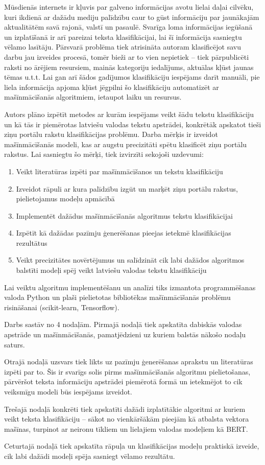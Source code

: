 Mūsdienās internets ir kļuvis par galveno informācijas avotu lielai daļai cilvēku, kuri ikdienā ar dažādu mediju palīdzību caur to gūst informāciju par jaunākajām aktualitātēm savā rajonā, valstī un pasaulē. Svarīga loma informācijas iegūšanā un izplatīšanā ir arī pareizai teksta klasifikācijai, lai šī informācija sasniegtu vēlamo lasītāju. Pārsvarā problēma tiek atrisināta autoram klasificējot savu darbu jau izveides procesā, tomēr bieži ar to vien nepietiek – tiek pārpublicēti raksti no ārējiem resursiem, mainās kategoriju iedalījums, aktuālas kļūst jaunas tēmas u.t.t. Lai gan arī šādos gadījumos klasifikāciju iespējams darīt manuāli, pie liela informācija apjoma kļūst jēgpilni šo klasifikāciju automatizēt ar mašīnmācīšanās algoritmiem, ietaupot laiku un resursus. 

Autors plāno izpētīt metodes ar kurām iespējams veikt šādu tekstu klasifikāciju un kā tās ir piemērotas latviešu valodas tekstu apstrādei, konkrētāk apskatot tieši ziņu portālu rakstu klasifikācijas problēmu. Darba mērķis ir izveidot mašīnmācīšanās modeli, kas ar augstu precizitāti spētu klasificēt ziņu portālu rakstus. Lai sasniegtu šo mērķi, tiek izvirzīti sekojoši uzdevumi:
\begin{enumerate}
\item Veikt literatūras izpēti par mašīnmācīšanos un tekstu klasifikāciju
\item Izveidot rāpuli ar kura palīdzību izgūt un marķēt ziņu portālu rakstus, pielietojamus modeļu apmācībā
\item Implementēt dažādus mašīnmācīšanās algoritmus tekstu klasifikācijai
\item Izpētīt kā dažādas pazīmju ģenerēšanas pieejas ietekmē klasifikācijas rezultātus
\item Veikt precizitātes novērtējumus un salīdzināt cik labi dažādos algoritmos balstīti modeļi spēj veikt latviešu valodas tekstu klasifikāciju
\end{enumerate}

Lai veiktu algoritmu implementēšanu un analīzi tiks izmantota programmēšanas valoda Python un plaši pielietotas bibliotēkas mašīnmācīšanās problēmu risināšanai (scikit-learn, Tensorflow).

Darbs sastāv no 4 nodaļām. Pirmajā nodaļā tiek apskatīta dabiskās valodas apstrāde un mašīnmācīšanās, pamatjēdzieni uz kuriem balstās nākošo nodaļu saturs.

Otrajā nodaļā uzsvars tiek likts uz pazīmju ģenerēšanas aprakstu un literatūras izpēti par to. Šis ir svarīgs solis pirms mašīnmācīšanās algoritmu pielietošanas, pārvēršot teksta informāciju apstrādei piemērotā formā un ietekmējot to cik veiksmīgu modeli būs iespējams izveidot.

Trešajā nodaļā konkrēti tiek apskatīti dažādi izplatītākie algoritmi ar kuriem veikt teksta klasifikāciju – sākot no vienkāršākām pieejām kā atbalsta vektora mašīnas, turpinot ar neironu tīkliem un lielajiem valodas modeļiem kā BERT.

Ceturtajā nodaļā tiek apskatīta rāpuļa un klasifikācijas modeļu praktiskā izveide, cik labi dažādi modeļi spēja sasniegt vēlamo rezultātu.
